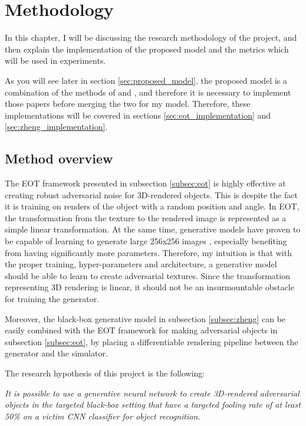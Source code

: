 \chapter{Methodology}
    \label{chap:methodology}
    
In this chapter, I will be discussing the research methodology of the project, and then explain the implementation of the proposed model and the metrics which will be used in experiments.

As you will see later in section \ref{sec:proposed_model}, the proposed model is a combination of the methods of \cite{athalye} and \cite{zheng_black_box_GAN}, and therefore it is necessary to implement those papers before merging the two for my model. Therefore, these implementations will be covered in sections \ref{sec:eot_implementation} and \ref{sec:zheng_implementation}.
    
\section{Method overview}

The EOT framework presented in subsection \ref{subsec:eot} is highly effective at creating robust adversarial noise for 3D-rendered objects. This is despite the fact it is training on renders of the object with a random position and angle. In EOT, the transformation from the texture to the rendered image is represented as a simple linear transformation. At the same time, generative models have proven to be capable of learning to generate large 256x256 images \cite{big_gan}, especially benefiting from having significantly more parameters. Therefore, my intuition is that with the proper training, hyper-parameters and architecture, a generative model should be able to learn to create adversarial textures. Since the transformation representing 3D rendering is linear, it should not be an insurmountable obstacle for training the generator.

Moreover, the black-box generative model in subsection \ref{subsec:zheng} can be easily combined with the EOT framework for making adversarial objects in subsection \ref{subsec:eot}, by placing a differentiable rendering pipeline between the generator and the simulator.

\newpage
The research hypothesis of this project is the following: 

\textit{It is possible to use a generative neural network to create 3D-rendered adversarial objects in the targeted black-box setting that have a targeted fooling rate of at least 50\% on a victim CNN classifier for object recognition.}

